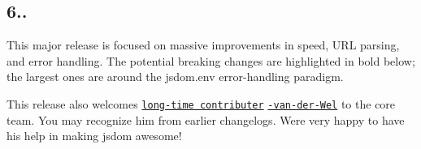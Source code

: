 \subsection*{6..}

This major release is focused on massive improvements in speed, U\+RL parsing, and error handling. The potential breaking changes are highlighted in bold below; the largest ones are around the {\ttfamily jsdom.\+env} error-\/handling paradigm.

This release also welcomes \href{https://github.com/tmpvar/jsdom/commits/master?author=Joris-van-der-Wel}{\tt long-\/time contributer} \href{https://github.com/Joris-van-der-Wel/}{\tt -\/van-\/der-\/\+Wel} to the core team. You may recognize him from earlier changelogs. We\textquotesingle{}re very happy to have his help in making jsdom awesome!


